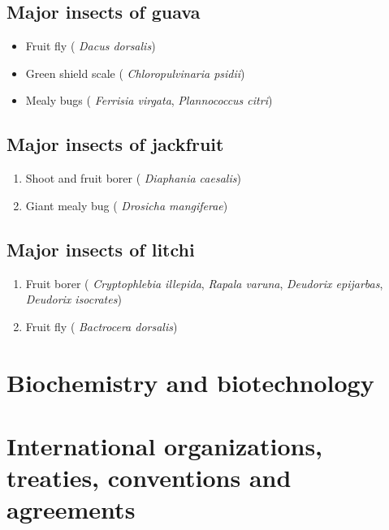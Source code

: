 \documentclass[
  openany]{book}
\providecommand{\tightlist}{%
  \setlength{\itemsep}{0pt}\setlength{\parskip}{0pt}}
\begin{document}
\hypertarget{major-insects-of-guava}{%
\section{Major insects of guava}\label{major-insects-of-guava}}

\begin{itemize}
\tightlist
\item
  Fruit fly ( \emph{Dacus dorsalis})
\item
  Green shield scale ( \emph{Chloropulvinaria psidii})
\item
  Mealy bugs ( \emph{Ferrisia virgata}, \emph{Plannococcus citri})
\end{itemize}

\hypertarget{major-insects-of-jackfruit}{%
\section{Major insects of jackfruit}\label{major-insects-of-jackfruit}}

\begin{enumerate}
\def\labelenumi{\arabic{enumi}.}
\tightlist
\item
  Shoot and fruit borer ( \emph{Diaphania caesalis})
\item
  Giant mealy bug ( \emph{Drosicha mangiferae})
\end{enumerate}

\hypertarget{major-insects-of-litchi}{%
\section{Major insects of litchi}\label{major-insects-of-litchi}}

\begin{enumerate}
\def\labelenumi{\arabic{enumi}.}
\tightlist
\item
  Fruit borer ( \emph{Cryptophlebia illepida}, \emph{Rapala varuna}, \emph{Deudorix epijarbas}, \emph{Deudorix isocrates})
\item
  Fruit fly ( \emph{Bactrocera dorsalis})
\end{enumerate}

\hypertarget{biochemistry-and-biotechnology}{%
\chapter{Biochemistry and biotechnology}\label{biochemistry-and-biotechnology}}

\hypertarget{international-organizations-treaties-conventions-and-agreements}{%
\chapter{International organizations, treaties, conventions and agreements}\label{international-organizations-treaties-conventions-and-agreements}}
\end{document}
